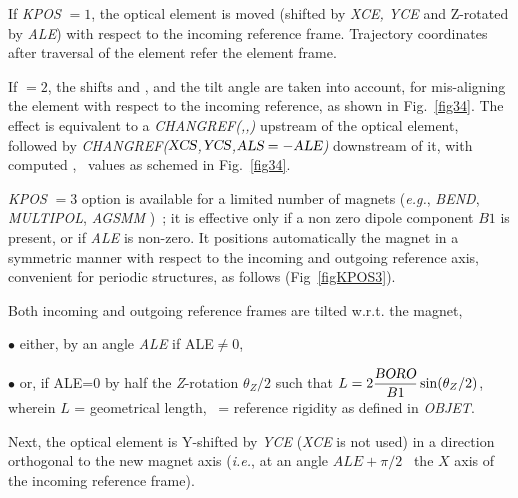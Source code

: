  If \textsl{KPOS} $ =1$, the optical element is moved (shifted by \textsl{XCE, YCE} and Z-rotated by 
\textsl{ALE}) with respect to the incoming reference frame. Trajectory coordinates after traversal of the 
element refer the element frame. 

\medskip

\noindent If  \KPOS$=2 $, the shifts  \XCE{}   
and   \YCE{}, and the tilt angle \ALE{}   are taken into 
account, for mis-aligning  the element with respect to the incoming 
reference, as shown in Fig.~\ref{fig34}.  
The effect is equivalent to  a \textsl{CHANGREF(\XCE,\YCE,\ALE)}  upstream of the 
optical element, followed by   \textsl{CHANGREF($\textsl{XCS}$,$\textsl{YCS}$,$\textsl{ALS}=-\textsl{ALE}$)} downstream of it, with 
 computed \XCS, \YCS\ values as schemed in Fig.~\ref{fig34}.  

\medskip

\noindent \textsl{KPOS} $=3 $ option is available for a limited number of  
 magnets  (\emph{e.g.}, \textsl{BEND}, \textsl{MULTIPOL}, \textsl{AGSMM} )~; 
it is effective only if a non zero dipole component $B1$ is present, or if  \textsl{ALE} is non-zero. 
It positions automatically the magnet in a symmetric manner with respect to the incoming and outgoing reference 
axis, convenient for periodic structures, as follows (Fig~\ref{figKPOS3}). 

\medskip
 
\noindent Both incoming and outgoing reference frames are  tilted w.r.t. the magnet,  

 $\bullet$ either,  by an angle \textsl{ALE}  if ALE$\not =$0, 

 $\bullet$ or, if ALE=0  by  half the \textsl{Z}-rotation $\theta_Z/2$ such that $ L = 
2 \dfrac{\textsl{BORO}}{B1} \sin({\theta_Z}/{2})$,  wherein $L$ = geometrical length, 
\BORO\  = reference rigidity as defined in \textsl{OBJET}.

\noindent Next, the optical element is  Y-shifted by \textsl{YCE} (\textsl{XCE} is not used) in a 
direction orthogonal to the new magnet axis (\emph{i.e.}, at an angle $ALE+\pi/2$ \wrt\ the $X$ axis of the incoming 
reference frame).



